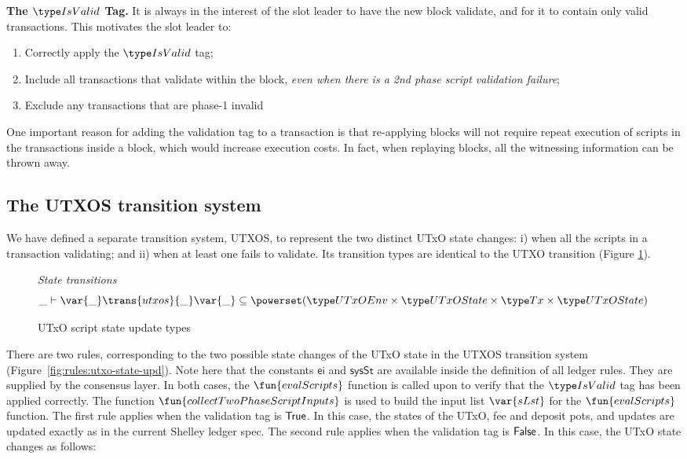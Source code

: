 \textbf{The $\IsValid$ Tag. }
It is always in the interest of the slot leader to have the new block validate,
and for it to contain only valid transactions. This motivates the
slot leader to:

\begin{enumerate}
  \item Correctly apply the $\IsValid$ tag;
  \item Include all transactions that validate within the block,
  \textit{even when there is a 2nd phase script validation failure};
  \item Exclude any transactions that are phase-1 invalid
\end{enumerate}

One important reason for adding the validation tag
to a transaction is that re-applying blocks will not require repeat
execution of scripts in the transactions inside a block, which would increase execution costs.
In fact, when replaying
blocks, all the witnessing information can be thrown away.

\subsection{The UTXOS transition system}
\label{sec:utxo-state-trans}

We have defined a separate transition system, UTXOS, to represent the two distinct
UTxO state changes: i) when all the scripts in a transaction validating; and
ii) when at least one fails to validate. Its transition types
are identical to the UTXO transition (Figure
\ref{fig:ts-types:utxo-scripts}).

\begin{figure}[htb]
  \emph{State transitions}
  \begin{equation*}
    \_ \vdash
    \var{\_} \trans{utxos}{\_} \var{\_}
    \subseteq \powerset (\UTxOEnv \times \UTxOState \times \Tx \times \UTxOState)
  \end{equation*}
  \caption{UTxO script state update types}
  \label{fig:ts-types:utxo-scripts}
\end{figure}

There are two rules, corresponding to the two possible state changes of the
UTxO state in the UTXOS transition system (Figure~\ref{fig:rules:utxo-state-upd}).
Note here that the constants $\mathsf{ei}$ and $\mathsf{sysSt}$ are available
inside the definition of all ledger rules. They are supplied by the consensus
layer.
%
In both cases, the $\fun{evalScripts}$ function is called upon to verify that the $\IsValid$
tag has been applied correctly. The function $\fun{collectTwoPhaseScriptInputs}$ is used to build
the input list $\var{sLst}$ for the $\fun{evalScripts}$ function.
%
The first rule
applies when the validation tag is $\mathsf{True}$.
In this case, the states of the UTxO, fee
  and deposit pots, and updates are updated exactly as in the current Shelley
  ledger spec.
%
  The second rule
  applies when the validation tag is $\mathsf{False}$.
  In this case, the UTxO state changes as follows:

